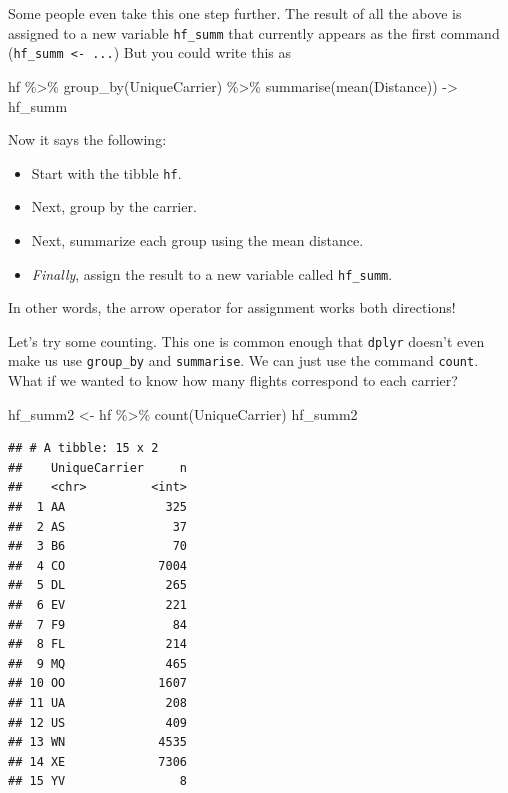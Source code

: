\documentclass[
]{book}
\newenvironment{Shaded}{\begin{snugshade}}{\end{snugshade}}
\newcommand{\FunctionTok}[1]{\textcolor[rgb]{0.00,0.00,0.00}{#1}}
\newcommand{\NormalTok}[1]{#1}
\newcommand{\OtherTok}[1]{\textcolor[rgb]{0.56,0.35,0.01}{#1}}
\newcommand{\SpecialCharTok}[1]{\textcolor[rgb]{0.00,0.00,0.00}{#1}}
\providecommand{\tightlist}{%
  \setlength{\itemsep}{0pt}\setlength{\parskip}{0pt}}
\begin{document}
Some people even take this one step further. The result of all the above is assigned to a new variable \texttt{hf\_summ} that currently appears as the first command (\texttt{hf\_summ\ \textless{}-\ ...}) But you could write this as

\begin{Shaded}
\begin{Highlighting}[]
\NormalTok{hf }\SpecialCharTok{\%\textgreater{}\%}
    \FunctionTok{group\_by}\NormalTok{(UniqueCarrier) }\SpecialCharTok{\%\textgreater{}\%}
    \FunctionTok{summarise}\NormalTok{(}\FunctionTok{mean}\NormalTok{(Distance)) }\OtherTok{{-}\textgreater{}}\NormalTok{ hf\_summ}
\end{Highlighting}
\end{Shaded}

Now it says the following:

\begin{itemize}
\tightlist
\item
  Start with the tibble \texttt{hf}.
\item
  Next, group by the carrier.
\item
  Next, summarize each group using the mean distance.
\item
  \emph{Finally}, assign the result to a new variable called \texttt{hf\_summ}.
\end{itemize}

In other words, the arrow operator for assignment works both directions!

Let's try some counting. This one is common enough that \texttt{dplyr} doesn't even make us use \texttt{group\_by} and \texttt{summarise}. We can just use the command \texttt{count}. What if we wanted to know how many flights correspond to each carrier?

\begin{Shaded}
\begin{Highlighting}[]
\NormalTok{hf\_summ2 }\OtherTok{\textless{}{-}}\NormalTok{ hf }\SpecialCharTok{\%\textgreater{}\%}
    \FunctionTok{count}\NormalTok{(UniqueCarrier)}
\NormalTok{hf\_summ2}
\end{Highlighting}
\end{Shaded}

\begin{verbatim}
## # A tibble: 15 x 2
##    UniqueCarrier     n
##    <chr>         <int>
##  1 AA              325
##  2 AS               37
##  3 B6               70
##  4 CO             7004
##  5 DL              265
##  6 EV              221
##  7 F9               84
##  8 FL              214
##  9 MQ              465
## 10 OO             1607
## 11 UA              208
## 12 US              409
## 13 WN             4535
## 14 XE             7306
## 15 YV                8
\end{verbatim}
\end{document}
